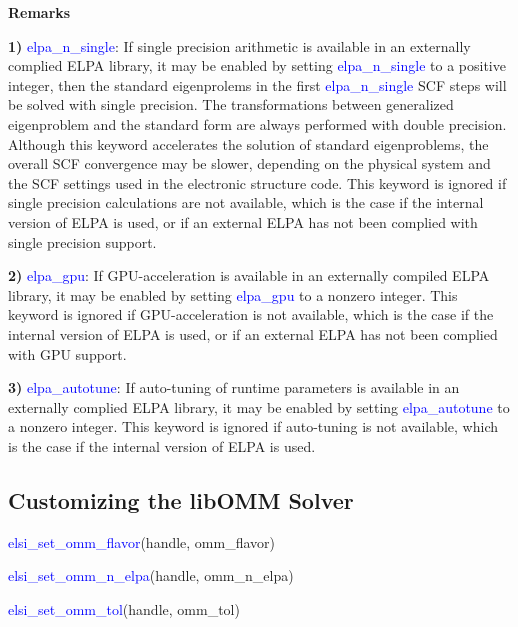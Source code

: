 \documentclass{report}
\begin{document}
\textbf{Remarks}

\textbf{1)} \textcolor{blue}{elpa\_n\_single}: If single precision arithmetic is available in an externally complied ELPA library, it may be enabled by setting \textcolor{blue}{elpa\_n\_single} to a positive integer, then the standard eigenprolems in the first \textcolor{blue}{elpa\_n\_single} SCF steps will be solved with single precision. The transformations between generalized eigenproblem and the standard form are always performed with double precision. Although this keyword accelerates the solution of standard eigenproblems, the overall SCF convergence may be slower, depending on the physical system and the SCF settings used in the electronic structure code. This keyword is ignored if single precision calculations are not available, which is the case if the internal version of ELPA is used, or if an external ELPA has not been complied with single precision support.

\textbf{2)} \textcolor{blue}{elpa\_gpu}: If GPU-acceleration is available in an externally compiled ELPA library, it may be enabled by setting \textcolor{blue}{elpa\_gpu} to a nonzero integer. This keyword is ignored if GPU-acceleration is not available, which is the case if the internal version of ELPA is used, or if an external ELPA has not been complied with GPU support.

\textbf{3)} \textcolor{blue}{elpa\_autotune}: If auto-tuning of runtime parameters is available in an externally complied ELPA library, it may be enabled by setting \textcolor{blue}{elpa\_autotune} to a nonzero integer. This keyword is ignored if auto-tuning is not available, which is the case if the internal version of ELPA is used.

\subsection{Customizing the libOMM Solver}
\label{subsec:setter_omm}
\begin{labeling}{\hspace{6cm}}
\item [\hspace{0.3cm} \textcolor{blue}{elsi\_set\_omm\_flavor}(handle, omm\_flavor)]
\item [\hspace{0.3cm} \textcolor{blue}{elsi\_set\_omm\_n\_elpa}(handle, omm\_n\_elpa)]
\item [\hspace{0.3cm} \textcolor{blue}{elsi\_set\_omm\_tol}(handle, omm\_tol)]
\end{labeling}
\end{document}
